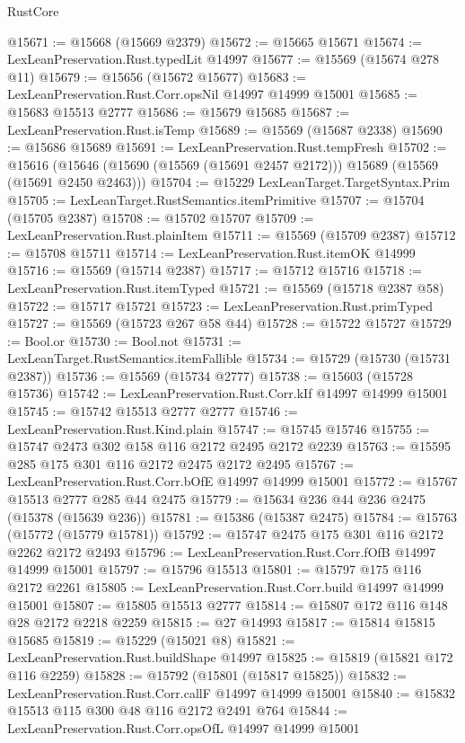 \begin{lexlean}{RustCore}
\begin{coremodule}
@15671 := @15668 (@15669 @2379)
@15672 := @15665 @15671
@15674 := LexLeanPreservation.Rust.typedLit @14997
@15677 := @15569 (@15674 @278 @11)
@15679 := @15656 (@15672 @15677)
@15683 := LexLeanPreservation.Rust.Corr.opsNil @14997 @14999 @15001
@15685 := @15683 @15513 @2777
@15686 := @15679 @15685
@15687 := LexLeanPreservation.Rust.isTemp
@15689 := @15569 (@15687 @2338)
@15690 := @15686 @15689
@15691 := LexLeanPreservation.Rust.tempFresh
@15702 := @15616
    (@15646 (@15690 (@15569 (@15691 @2457 @2172))) @15689 (@15569 (@15691 @2450 @2463)))
@15704 := @15229 LexLeanTarget.TargetSyntax.Prim
@15705 := LexLeanTarget.RustSemantics.itemPrimitive
@15707 := @15704 (@15705 @2387)
@15708 := @15702 @15707
@15709 := LexLeanPreservation.Rust.plainItem
@15711 := @15569 (@15709 @2387)
@15712 := @15708 @15711
@15714 := LexLeanPreservation.Rust.itemOK @14999
@15716 := @15569 (@15714 @2387)
@15717 := @15712 @15716
@15718 := LexLeanPreservation.Rust.itemTyped
@15721 := @15569 (@15718 @2387 @58)
@15722 := @15717 @15721
@15723 := LexLeanPreservation.Rust.primTyped
@15727 := @15569 (@15723 @267 @58 @44)
@15728 := @15722 @15727
@15729 := Bool.or
@15730 := Bool.not
@15731 := LexLeanTarget.RustSemantics.itemFallible
@15734 := @15729 (@15730 (@15731 @2387))
@15736 := @15569 (@15734 @2777)
@15738 := @15603 (@15728 @15736)
@15742 := LexLeanPreservation.Rust.Corr.kIf @14997 @14999 @15001
@15745 := @15742 @15513 @2777 @2777
@15746 := LexLeanPreservation.Rust.Kind.plain
@15747 := @15745 @15746
@15755 := @15747 @2473 @302 @158 @116 @2172 @2495 @2172 @2239
@15763 := @15595 @285 @175 @301 @116 @2172 @2475 @2172 @2495
@15767 := LexLeanPreservation.Rust.Corr.bOfE @14997 @14999 @15001
@15772 := @15767 @15513 @2777 @285 @44 @2475
@15779 := @15634 @236 @44 @236 @2475 (@15378 (@15639 @236))
@15781 := @15386 (@15387 @2475)
@15784 := @15763 (@15772 (@15779 @15781))
@15792 := @15747 @2475 @175 @301 @116 @2172 @2262 @2172 @2493
@15796 := LexLeanPreservation.Rust.Corr.fOfB @14997 @14999 @15001
@15797 := @15796 @15513
@15801 := @15797 @175 @116 @2172 @2261
@15805 := LexLeanPreservation.Rust.Corr.build @14997 @14999 @15001
@15807 := @15805 @15513 @2777
@15814 := @15807 @172 @116 @148 @28 @2172 @2218 @2259
@15815 := @27 @14993
@15817 := @15814 @15815 @15685
@15819 := @15229 (@15021 @8)
@15821 := LexLeanPreservation.Rust.buildShape @14997
@15825 := @15819 (@15821 @172 @116 @2259)
@15828 := @15792 (@15801 (@15817 @15825))
@15832 := LexLeanPreservation.Rust.Corr.callF @14997 @14999 @15001
@15840 := @15832 @15513 @115 @300 @48 @116 @2172 @2491 @764
@15844 := LexLeanPreservation.Rust.Corr.opsOfL @14997 @14999 @15001

\end{coremodule}
\end{lexlean}
